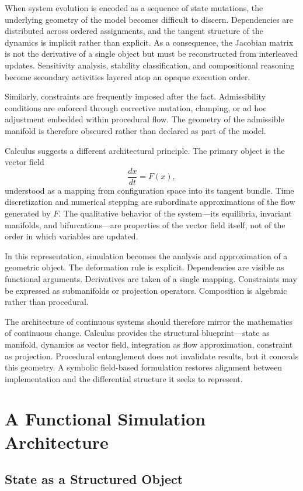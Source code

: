 \documentclass[12pt]{book}
\begin{document}
When system evolution is encoded as a sequence of state mutations,
the underlying geometry of the model becomes difficult to discern.
Dependencies are distributed across ordered assignments, and the
tangent structure of the dynamics is implicit rather than explicit.
As a consequence, the Jacobian matrix is not the derivative of a
single object but must be reconstructed from interleaved updates.
Sensitivity analysis, stability classification, and compositional
reasoning become secondary activities layered atop an opaque execution
order.

Similarly, constraints are frequently imposed after the fact.
Admissibility conditions are enforced through corrective mutation,
clamping, or ad hoc adjustment embedded within procedural flow.
The geometry of the admissible manifold is therefore obscured rather
than declared as part of the model.

Calculus suggests a different architectural principle. The primary
object is the vector field
\[
\frac{dx}{dt} = F(x),
\]
understood as a mapping from configuration space into its tangent
bundle. Time discretization and numerical stepping are subordinate
approximations of the flow generated by $F$. The qualitative behavior
of the system---its equilibria, invariant manifolds, and bifurcations---are properties of the vector field itself, not of the order in which
variables are updated.

In this representation, simulation becomes the analysis and
approximation of a geometric object. The deformation rule is explicit.
Dependencies are visible as functional arguments. Derivatives are
taken of a single mapping. Constraints may be expressed as
submanifolds or projection operators. Composition is algebraic rather
than procedural.

The architecture of continuous systems should therefore mirror the
mathematics of continuous change. Calculus provides the structural
blueprint---state as manifold, dynamics as vector field, integration as
flow approximation, constraint as projection. Procedural entanglement
does not invalidate results, but it conceals this geometry. A symbolic
field-based formulation restores alignment between implementation and
the differential structure it seeks to represent.

\chapter{A Functional Simulation Architecture}
\section{State as a Structured Object}
\end{document}

